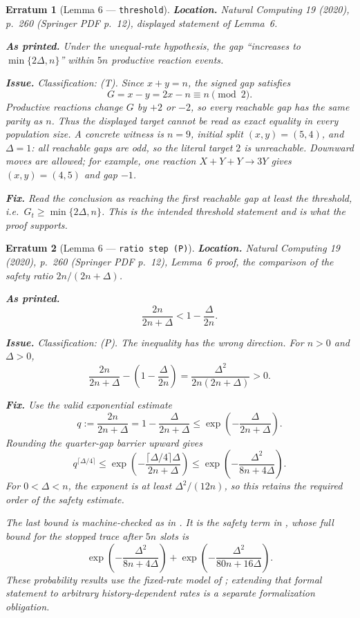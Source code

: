 \documentclass[11pt]{article}
\theoremstyle{erratumstyle}
\newtheorem{erratum}{Erratum}
\begin{document}
\begin{erratum}[Lemma 6 --- \texttt{threshold}]
\textbf{Location.} \emph{Natural Computing} 19 (2020), p.~260
(Springer PDF p.~12), displayed statement of Lemma~6.

\medskip
\textbf{As printed.} Under the unequal-rate hypothesis, the gap
``increases to $\min\{2\Delta,n\}$'' within $5n$ productive reaction events.

\medskip
\textbf{Issue.} Classification: (T). Since $x+y=n$, the signed gap satisfies
\[
  G=x-y=2x-n\equiv n\pmod 2.
\]
Productive reactions change $G$ by $+2$ or $-2$, so every reachable gap has
the same parity as $n$. Thus the displayed target cannot be read as exact
equality in every population size. A concrete witness is $n=9$, initial
split $(x,y)=(5,4)$, and $\Delta=1$: all reachable gaps are odd, so the
literal target $2$ is unreachable. Downward moves are allowed; for example,
one reaction $X+Y+Y\to3Y$ gives $(x,y)=(4,5)$ and gap $-1$.

\medskip
\textbf{Fix.} Read the conclusion as reaching the first reachable gap at least
the threshold, i.e.\ $G_t\ge \min\{2\Delta,n\}$. This is the intended
threshold statement and is what the proof supports.
\end{erratum}

\begin{erratum}[Lemma 6 --- \texttt{ratio step (P)}]
\textbf{Location.} \emph{Natural Computing} 19 (2020), p.~260
(Springer PDF p.~12), Lemma~6 proof, the comparison of the safety ratio
$2n/(2n+\Delta)$.

\medskip
\textbf{As printed.}
\[
  \frac{2n}{2n+\Delta}<1-\frac{\Delta}{2n}.
\]

\medskip
\textbf{Issue.} Classification: (P). The inequality has the wrong direction.
For $n>0$ and $\Delta>0$,
\[
  \frac{2n}{2n+\Delta}
    -\left(1-\frac{\Delta}{2n}\right)
  =\frac{\Delta^2}{2n(2n+\Delta)}>0.
\]

\medskip
\textbf{Fix.} Use the valid exponential estimate
\[
  q:=\frac{2n}{2n+\Delta}
    =1-\frac{\Delta}{2n+\Delta}
    \le \exp\!\left(-\frac{\Delta}{2n+\Delta}\right).
\]
Rounding the quarter-gap barrier upward gives
\[
  q^{\lceil\Delta/4\rceil}
    \le \exp\!\left(
      -\frac{\lceil\Delta/4\rceil\Delta}{2n+\Delta}\right)
    \le \exp\!\left(-\frac{\Delta^2}{8n+4\Delta}\right).
\]
For $0<\Delta<n$, the exponent is at least $\Delta^2/(12n)$, so this
retains the required order of the safety estimate.

The last bound is machine-checked as
 in .
It is the safety term in , whose
full bound for the stopped trace after $5n$ slots is
\[
  \exp\!\left(-\frac{\Delta^2}{8n+4\Delta}\right)
  +\exp\!\left(-\frac{\Delta^2}{80n+16\Delta}\right).
\]
These probability results use the fixed-rate model of
; extending that formal statement to arbitrary
history-dependent rates is a separate formalization obligation.
\end{erratum}
\end{document}
